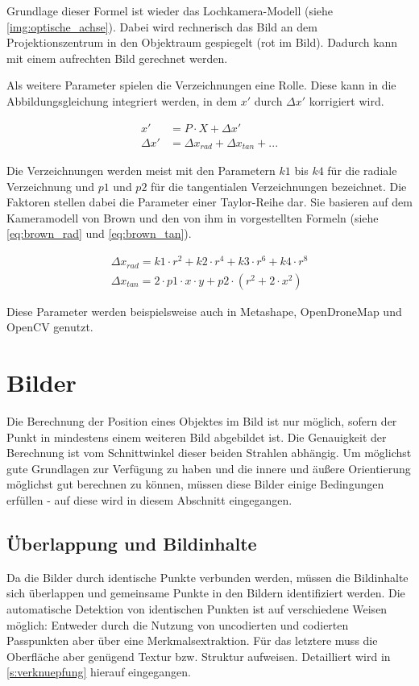 \documentclass[./00PhotoBox.tex]{subfiles}
\begin{document}
Grundlage dieser Formel ist wieder das Lochkamera-Modell (siehe \autoref{img:optische_achse}). Dabei wird rechnerisch das Bild an dem Projektionszentrum in den Objektraum gespiegelt (rot im Bild). Dadurch kann mit einem aufrechten Bild gerechnet werden.

Als weitere Parameter spielen die Verzeichnungen eine Rolle. Diese kann in die Abbildungsgleichung integriert werden, in dem $x'$ durch $\Delta x'$ korrigiert wird. \citep[S. 277]{luhmann}

\begin{align}
    \label{abbildungsgleichung_verzerrung}
    x'        & = P \cdot X + \Delta x'                 \\
    \Delta x' & = \Delta x_{rad} + \Delta x_{tan} + ...
\end{align}

Die Verzeichnungen werden meist mit den Parametern $k1$ bis $k4$ für die radiale Verzeichnung und $p1$ und $p2$ für die tangentialen Verzeichnungen bezeichnet. Die Faktoren stellen dabei die Parameter einer Taylor-Reihe dar. Sie basieren auf dem Kameramodell von Brown und den von ihm in \cite[S. 859]{brown1971} vorgestellten Formeln (siehe \autoref{eq:brown_rad} und \ref{eq:brown_tan}).

\begin{align}
    \label{eq:brown_rad}
    \Delta x_{rad} = k1 \cdot r^2 + k2 \cdot r^4 + k3 \cdot r^6 + k4 \cdot r^8 \\
    \label{eq:brown_tan}
    \Delta x_{tan} = 2 \cdot p1 \cdot x \cdot y + p2 \cdot (r^2 + 2 \cdot x^2)
\end{align}

Diese Parameter werden beispielsweise auch in Metashape, OpenDroneMap und OpenCV genutzt.


\section{Bilder}
\label{s:bilder}

Die Berechnung der Position eines Objektes im Bild ist nur möglich, sofern der Punkt in mindestens einem weiteren Bild abgebildet ist. Die Genauigkeit der Berechnung ist vom Schnittwinkel dieser beiden Strahlen abhängig. Um möglichst gute Grundlagen zur Ver\-fügung zu haben und die innere und äußere Orientierung möglichst gut berechnen zu können, müssen diese Bilder einige Bedingungen erfüllen - auf diese wird in diesem Abschnitt eingegangen.

\subsection{Überlappung und Bildinhalte}
Da die Bilder durch identische Punkte verbunden werden, müssen die Bildinhalte sich überlappen und gemeinsame Punkte in den Bildern identifiziert werden. Die automatische Detektion von identischen Punkten ist auf verschiedene Weisen möglich: Entweder durch die Nutzung von uncodierten und codierten Passpunkten aber über eine Merkmalsextraktion. Für das letztere muss die Oberfläche aber genügend Textur bzw. Struktur aufweisen. Detailliert wird in \autoref{s:verknuepfung} hierauf eingegangen. \citep[S. 478]{luhmann}
\end{document}

